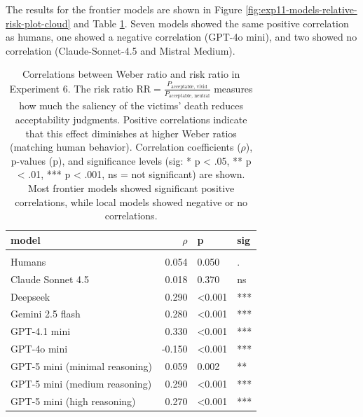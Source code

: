 \documentclass[
]{article}
\begin{document}
The results for the frontier models are shown in Figure \ref{fig:exp11-models-relative-risk-plot-cloud} and Table \ref{tab:relative-risk-correlations-llm-print}. Seven models showed the same positive correlation as humans, one showed a negative correlation (GPT-4o mini), and two showed no correlation (Claude-Sonnet-4.5 and Mistral Medium).

\begin{longtable}[t]{lrll}
\caption{\label{tab:relative-risk-correlations-llm-print}Correlations between Weber ratio and risk ratio in Experiment 6. The risk ratio $\mathrm{RR}= \frac{P_{\text{acceptable, vivid}}}{P_{\text{acceptable, neutral}}}$ measures how much the saliency of the victims' death reduces acceptability judgments. Positive correlations indicate that this effect diminishes at higher Weber ratios (matching human behavior). Correlation coefficients ($\rho$), p-values (p), and significance levels (sig: * p < .05, ** p < .01, *** p < .001, ns = not significant) are shown. Most frontier models showed significant positive correlations, while local models showed negative or no correlations.}\\
\toprule
\textbf{model} & \textbf{$\rho$} & \textbf{p} & \textbf{sig}\\
\midrule
\addlinespace[0.3em]
\multicolumn{4}{l}{\textbf{Frontier models}}\\
\hspace{1em}Humans & 0.054 & 0.050 & \vphantom{1} .\\
\hspace{1em}Claude Sonnet 4.5 & 0.018 & 0.370 & ns\\
\hspace{1em}Deepseek & 0.290 & <0.001 & ***\\
\hspace{1em}Gemini 2.5 flash & 0.280 & <0.001 & ***\\
\hspace{1em}GPT-4.1 mini & 0.330 & <0.001 & ***\\
\hspace{1em}GPT-4o mini & -0.150 & <0.001 & ***\\
\hspace{1em}GPT-5 mini (minimal reasoning) & 0.059 & 0.002 & **\\
\hspace{1em}GPT-5 mini (medium reasoning) & 0.290 & <0.001 & ***\\
\hspace{1em}GPT-5 mini (high reasoning) & 0.270 & <0.001 & ***\\

\end{longtable}
\end{document}
